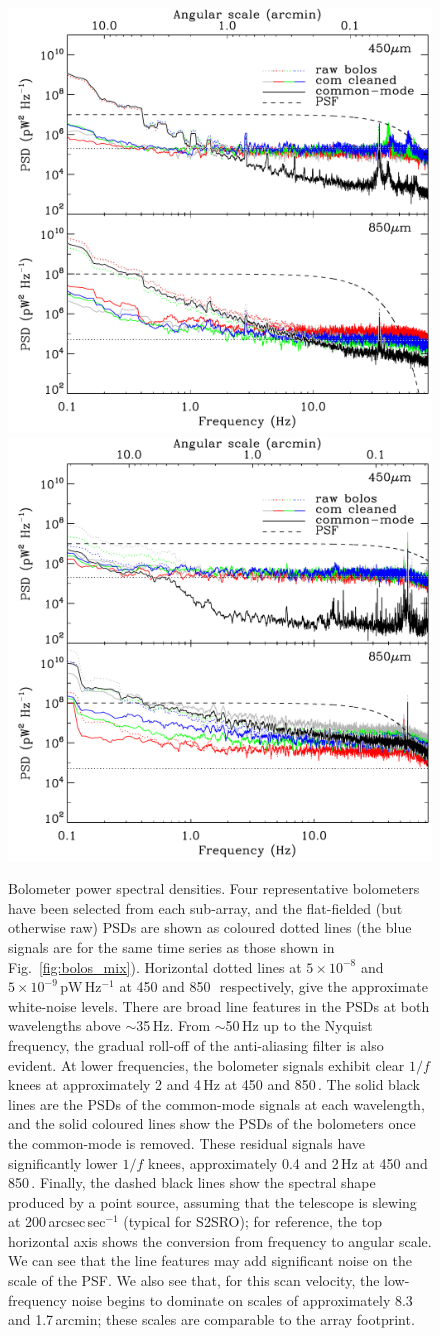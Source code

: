 \documentclass[useAMS,usenatbib,nofootinbib]{mn2e}
\begin{document}
\begin{figure}
\centering
\includegraphics[width=0.49\linewidth]{pspec_s2sro.pdf}
\includegraphics[width=0.49\linewidth]{pspec.pdf}
\caption{Bolometer power spectral densities. Four representative
  bolometers have been selected from each sub-array, and the
  flat-fielded (but otherwise raw) PSDs are shown as coloured dotted
  lines (the blue signals are for the same time series as those shown
  in Fig.~\ref{fig:bolos_mix}). Horizontal dotted lines at $5 \times
  10^{-8}$ and $5 \times 10^{-9}$\,pW\,Hz$^{-1}$ at 450 and
  850\,\micron\ respectively, give the approximate white-noise
  levels. There are broad line features in the PSDs at both
  wavelengths above $\sim$35\,Hz. From $\sim$50\,Hz up to the Nyquist
  frequency, the gradual roll-off of the anti-aliasing filter is also
  evident.  At lower frequencies, the bolometer signals exhibit clear
  $1/f$ knees at approximately 2 and 4\,Hz at 450 and
  850\,\micron. The solid black lines are the PSDs of the common-mode
  signals at each wavelength, and the solid coloured lines show the
  PSDs of the bolometers once the common-mode is removed. These
  residual signals have significantly lower $1/f$ knees, approximately
  0.4 and 2\,Hz at 450 and 850\,\micron. Finally, the dashed black
  lines show the spectral shape produced by a point source, assuming
  that the telescope is slewing at 200\,arcsec\,sec$^{-1}$ (typical
  for S2SRO); for reference, the top horizontal axis shows the
  conversion from frequency to angular scale. We can see that the line
  features may add significant noise on the scale of the PSF. We also
  see that, for this scan velocity, the low-frequency noise begins to
  dominate on scales of approximately 8.3 and 1.7\,arcmin; these scales
  are comparable to the array footprint.}
\label{fig:pspec}
\end{figure}
\end{document}
